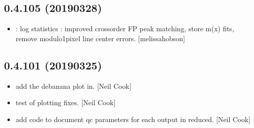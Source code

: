 \documentclass[a4paper,10pt,english]{report}
\begin{document}
\subsection{0.4.105 (2019\sphinxhyphen{}03\sphinxhyphen{}28)}
\label{\detokenize{misc/changelog:id176}}\begin{itemize}
\item {} 
: log statistics : improved cross\sphinxhyphen{}order FP
peak matching, store m(x) fits, remove modulo\sphinxhyphen{}1\sphinxhyphen{}pixel line center
errors. {[}melissa\sphinxhyphen{}hobson{]}

\end{itemize}


\subsection{0.4.101 (2019\sphinxhyphen{}03\sphinxhyphen{}25)}
\label{\detokenize{misc/changelog:id177}}\begin{itemize}
\item {} 
 \sphinxhyphen{} add the debanana plot in. {[}Neil Cook{]}

\item {} 
 \sphinxhyphen{} test of plotting fixes. {[}Neil Cook{]}

\item {} 
 \sphinxhyphen{} add code to document qc parameters for each output in
reduced. {[}Neil Cook{]}

\end{itemize}
\end{document}
